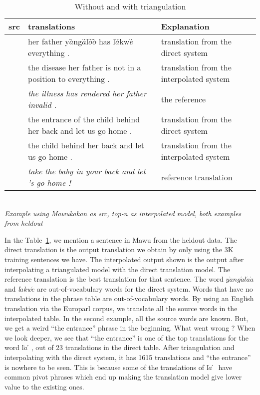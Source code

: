 \begin{table}
	\caption{Without and with triangulation}
	\footnotesize
	\small
	\begin{tabular}{p{}p{}p{}}
	\toprule
	src & translations & Explanation \\
	\toprule
	\multirow{3}{*}{\mawuexample} 
	& her father y$\grave{a}$̀ng$\acute{a}$́l$\acute{o}$́$\grave{o}$̀ has l$\grave{a}$́kw$\grave{e}$́ everything . & translation from the direct system 
	\\ \cmidrule(r){2-3}
	&  the disease her father is not in a position to everything . & translation from the interpolated system 
	\\ \cmidrule(r){2-3}
	&  \emph{the illness has rendered her father invalid .}  & the reference 
	\\  
	\midrule
	\midrule
	\multirow{3}{*}{\anothermawu} 
	&  the entrance of the child behind her back and let us go home . & translation from the direct system \\
	\cmidrule(r){2-3}
	&  the child behind her back and let us go home . & translation from the interpolated system \\
	\cmidrule(r){2-3}
	& \emph{take the baby in your back and let 's go home !} & reference translation \\
	\bottomrule
	\end{tabular}
	\\[3.5pt]
	{\centering \emph{Example using Mawukakan as src, top-\emph{n} as interpolated model, both examples from heldout}}
	\label{table:mawu_improvement}
\end{table}


In the Table~\ref{table:mawu_improvement}, we mention a sentence in Mawu from the heldout data. The direct translation is the output translation we obtain by only using the 3K training sentences we have. The interpolated output shown is the output after interpolating a triangulated model with the direct translation model. The reference translation is the best translation for that sentence. The word \emph{$y\grave{a}ng\acute{a}l\acute{a}\grave{a}$} and \emph{l$\acute{a}$kw$\acute{e}$} are out-of-vocabulary words for the direct system. Words that have no translations in the phrase table are out-of-vocabulary words. By using an English translation via the Europarl corpus, we translate all the source words in the interpolated table. In the second example, all the source words are known. But, we get a weird ``the entrance'' phrase in the beginning. What went wrong ? When we look deeper, we see that ``the entrance'' is one of the top translations for the word l$\grave{a}́$, out of 23 translations in the direct table. After triangulation and interpolating with the direct system, it has 1615 translations and ``the entrance'' is nowhere to be seen. This is because some of the translations of l$\grave{a}́$ have common pivot phrases which end up making the translation model give lower value to the existing ones. 


